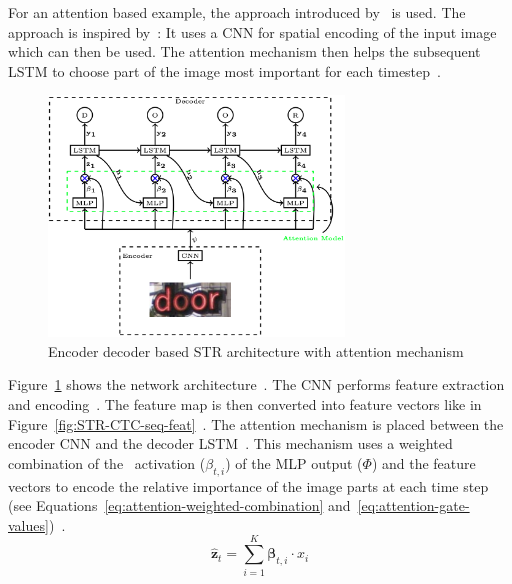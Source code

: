 For an attention based example, the approach introduced by~\cite{ghosh_visual_2017} is used.
The approach is inspired by~\cite{bahdanau_neural_2016,xu_show_2016}: It uses a \ac{CNN} for
spatial encoding of the input image which can then be used.
The attention mechanism then helps the subsequent \ac{LSTM} to choose part of the image most
important for each timestep~\citep{ghosh_visual_2017}.
\begin{figure}[h]
    \centering
    \includegraphics[width=0.7\textwidth]{img/STR-encdec-attention-Gosh-Visual-2017.png}
    \caption[Encoder decoder \& attention based STR architecture]{%
        Encoder decoder based STR architecture with attention
        mechanism~\citep{ghosh_visual_2017}\label{fig:STR-attention}
    }
\end{figure}
Figure~\ref{fig:STR-attention} shows the network architecture~\citep{ghosh_visual_2017}.
The \ac{CNN} performs feature extraction and encoding~\citep{ghosh_visual_2017}.
The feature map is then converted into feature vectors like in
Figure~\ref{fig:STR-CTC-seq-feat}~\citep{ghosh_visual_2017,shi_end--end_2017}.
The attention mechanism is placed between the encoder \ac{CNN} and the decoder
\ac{LSTM}~\citep{ghosh_visual_2017}.
This mechanism uses a weighted combination of the \sfmx\ activation ($\beta_{t,i}$) of the \ac{MLP}
output ($\Phi$) and the feature vectors to encode the relative importance of the image parts at
each time step (see Equations~\ref{eq:attention-weighted-combination}
and~\ref{eq:attention-gate-values})~\citep{ghosh_visual_2017,xu_show_2016}.
\begin{equation}\label{eq:attention-weighted-combination}
    \hat{\textbf{z}}_t=\sum_{i=1}^{K}\boldsymbol{\beta}_{t,i}\cdot x_i
\end{equation}
